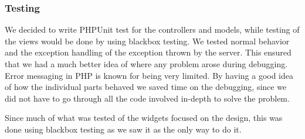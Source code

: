 \subsubsection{Testing}
We decided to write PHPUnit test for the controllers and models, while testing of the views would be done by using blackbox testing. We tested normal behavior and the exception handling of the exception thrown by the server. This ensured that we had a much better idea of where any problem arose during debugging. Error messaging in PHP is known for being very limited. By having a good idea of how the individual parts behaved we saved time on the debugging, since we did not have to go through all the code involved in-depth to solve the problem. 

Since much of what was tested of the widgets focused on the design, this was done using blackbox testing as we saw it as the only way to do it.